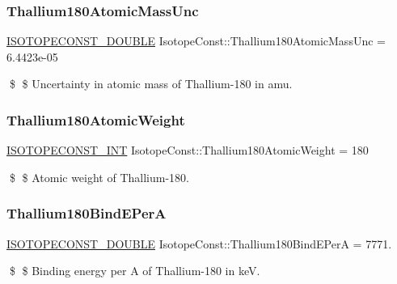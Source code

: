 \subsubsection{\texorpdfstring{Thallium180\+Atomic\+Mass\+Unc}{Thallium180AtomicMassUnc}}
{\footnotesize\ttfamily \mbox{\hyperlink{group___isotope_const-_macros_ga8f45a7272ce02c0b4c65c44636ed719a}{I\+S\+O\+T\+O\+P\+E\+C\+O\+N\+S\+T\+\_\+\+D\+O\+U\+B\+LE}} Isotope\+Const\+::\+Thallium180\+Atomic\+Mass\+Unc = 6.\+4423e-\/05}

\$ \$ Uncertainty in atomic mass of Thallium-\/180 in amu. \mbox{\label{group___isotope_const-_thallium-_tl180_ga7a18dd60e6eeccc14e8c332582ac343e}} 
\subsubsection{\texorpdfstring{Thallium180\+Atomic\+Weight}{Thallium180AtomicWeight}}
{\footnotesize\ttfamily \mbox{\hyperlink{group___isotope_const-_macros_ga5f18360b3e99483a35c32d789e62621c}{I\+S\+O\+T\+O\+P\+E\+C\+O\+N\+S\+T\+\_\+\+I\+NT}} Isotope\+Const\+::\+Thallium180\+Atomic\+Weight = 180}

\$ \$ Atomic weight of Thallium-\/180. \mbox{\label{group___isotope_const-_thallium-_tl180_gab971597748f13cb9c1d98720f91cc7f9}} 
\subsubsection{\texorpdfstring{Thallium180\+Bind\+E\+PerA}{Thallium180BindEPerA}}
{\footnotesize\ttfamily \mbox{\hyperlink{group___isotope_const-_macros_ga8f45a7272ce02c0b4c65c44636ed719a}{I\+S\+O\+T\+O\+P\+E\+C\+O\+N\+S\+T\+\_\+\+D\+O\+U\+B\+LE}} Isotope\+Const\+::\+Thallium180\+Bind\+E\+PerA = 7771.}

\$ \$ Binding energy per A of Thallium-\/180 in keV. \mbox{\label{group___isotope_const-_thallium-_tl180_ga618de0ba75f3903b6b0c8e81de3eae48}} 
